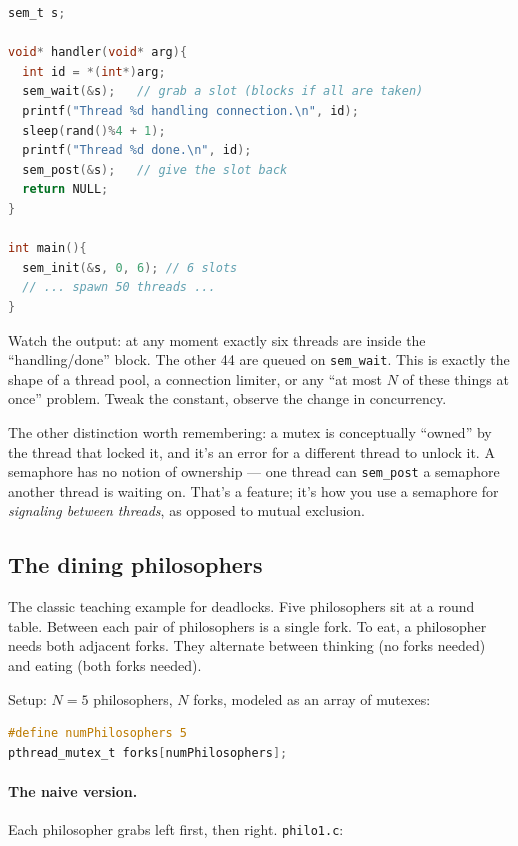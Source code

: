 \documentclass[11pt]{article}
\begin{document}
\begin{lstlisting}[language=C]
sem_t s;

void* handler(void* arg){
  int id = *(int*)arg;
  sem_wait(&s);   // grab a slot (blocks if all are taken)
  printf("Thread %d handling connection.\n", id);
  sleep(rand()%4 + 1);
  printf("Thread %d done.\n", id);
  sem_post(&s);   // give the slot back
  return NULL;
}

int main(){
  sem_init(&s, 0, 6); // 6 slots
  // ... spawn 50 threads ...
}
\end{lstlisting}

Watch the output: at any moment exactly six threads are inside the
``handling/done'' block. The other 44 are queued on
\texttt{sem\_wait}. This is exactly the shape of a thread pool, a
connection limiter, or any ``at most $N$ of these things at once''
problem. Tweak the constant, observe the change in concurrency.

The other distinction worth remembering: a mutex is conceptually
``owned'' by the thread that locked it, and it's an error for a
different thread to unlock it. A semaphore has no notion of ownership
--- one thread can \texttt{sem\_post} a semaphore another thread is
waiting on. That's a feature; it's how you use a semaphore for
\emph{signaling between threads}, as opposed to mutual exclusion.

\subsection*{The dining philosophers}

The classic teaching example for deadlocks. Five philosophers sit at a
round table. Between each pair of philosophers is a single fork.  To
eat, a philosopher needs both adjacent forks. They alternate between
thinking (no forks needed) and eating (both forks needed).

Setup: \(N = 5\) philosophers, \(N\) forks, modeled as an array of
mutexes:

\begin{lstlisting}[language=C]
#define numPhilosophers 5
pthread_mutex_t forks[numPhilosophers];
\end{lstlisting}

\paragraph{The naive version.} Each philosopher grabs left first, then
right. \texttt{philo1.c}:
\end{document}
